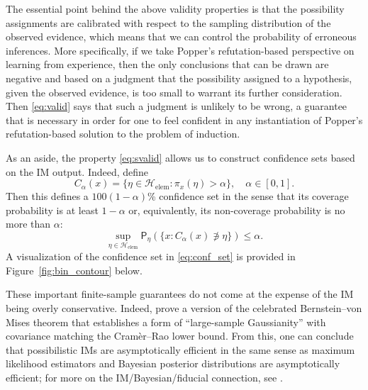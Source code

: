 \documentclass[a4paper, 12pt]{article}
\theoremstyle{plain}
\theoremstyle{definition}
\theoremstyle{remark}
\newcommand{\prob}{\mathsf{P}}
\renewcommand{\H}{\mathcal{H}}
\begin{document}
The essential point behind the above validity properties is that the possibility assignments are calibrated with respect to the sampling distribution of the observed evidence, which means that we can control the probability of erroneous inferences.  More specifically, if we take Popper's refutation-based perspective on learning from experience, then the only conclusions that can be drawn are negative and based on a judgment that the possibility assigned to a hypothesis, given the observed evidence, is too small to warrant its further consideration.  Then \eqref{eq:valid} says that such a judgment is unlikely to be wrong, a guarantee that is necessary in order for one to feel confident in any instantiation of Popper's refutation-based solution to the problem of induction.  

As an aside, the property \eqref{eq:svalid} allows us to construct confidence sets based on the IM output.  Indeed, define 
\begin{equation}
\label{eq:conf_set}
C_\alpha(x) = \{\eta \in \H_\text{elem}: \pi_x(\eta) > \alpha\}, \quad \alpha \in [0,1]. 
\end{equation}
Then this defines a $100(1-\alpha)$\% confidence set in the sense that its coverage probability is at least $1-\alpha$ or, equivalently, its non-coverage probability is no more than $\alpha$:
\[ \sup_{\eta \in \H_\text{elem}} \prob_\eta(\{x: C_\alpha(x) \not\ni \eta\}) \leq \alpha. \]
A visualization of the confidence set in \eqref{eq:conf_set} is provided in Figure~\ref{fig:bin_contour} below. 

These important finite-sample guarantees do not come at the expense of the IM being overly conservative.  Indeed, \citet{imbvm.ext} prove a version of the celebrated Bernstein--von Mises theorem that establishes a form of ``large-sample Gaussianity'' with covariance matching the Cram\`er--Rao lower bound.  From this, one can conclude that possibilistic IMs are asymptotically efficient in the same sense as maximum likelihood estimators and Bayesian posterior distributions are asymptotically efficient; for more on the IM/Bayesian/fiducial connection, see \citet{martin.isipta2023, reimagined}. 
\end{document}
